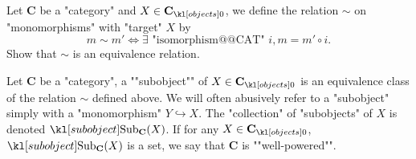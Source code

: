 \documentclass[main.tex]{subfiles}
\begin{document}
\begin{exer}\label{exer:duality:equivsubobj}
	Let $\mathbf{C}$ be a "category" and $X \in \obj{\mathbf{C}}$, we define the relation $\sim$ on "monomorphisms" with "target" $X$ by \[m \sim m' \Leftrightarrow \exists \text{ "isomorphism@@CAT" } i,  m = m' \circ i.\]
	Show that $\sim$ is an equivalence relation.
\end{exer}
\begin{defn}[Subobject]
	\AP Let $\mathbf{C}$ be a "category", a ""subobject"" of $X \in \obj{\mathbf{C}}$ is an equivalence class of the relation $\sim$ defined above. We will often abusively refer to a "subobject" simply with a "monomorphism" $Y \hookrightarrow X$. The "collection" of "subobjects" of $X$ is denoted $\Sub_{\mathbf{C}}(X)$. \AP If for any $X \in \obj{\mathbf{C}}$, $\Sub_{\mathbf{C}}(X)$ is a set, we say that $\mathbf{C}$ is ""well-powered"".
\end{defn}
\end{document}
